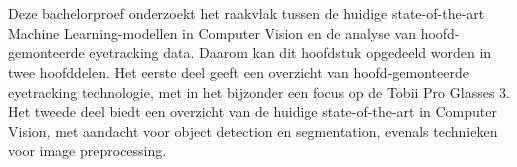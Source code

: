 




\chapter{}%
\label{ch:stand-van-zaken}

Deze bachelorproef onderzoekt het raakvlak tussen de huidige state-of-the-art Machine Learning-modellen in Computer Vision en de analyse van hoofd-gemonteerde eyetracking data.
Daarom kan dit hoofdstuk opgedeeld worden in twee hoofddelen. Het eerste deel geeft een overzicht van hoofd-gemonteerde eyetracking technologie, met in het bijzonder een focus op de Tobii Pro Glasses 3.
Het tweede deel biedt een overzicht van de huidige state-of-the-art in Computer Vision, met aandacht voor object detection en segmentation, evenals technieken voor image preprocessing.

